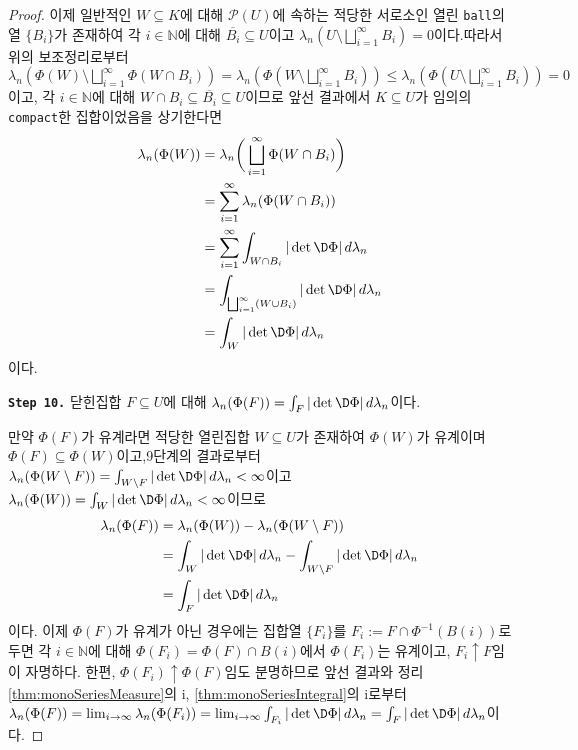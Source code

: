 \begin{proof}
    이제 일반적인 $W\subseteq K$에 대해 $\mathcal{P}(U)$에 속하는 적당한 서로소인 열린 \texttt{ball}의 열 $\{B_i\}$가 존재하여 각 $i\in\mathbb{N}$에 대해 $\overline{B_i}\subseteq U$이고 $\lambda_n(U\setminus\bigsqcup_{i=1}^\infty B_i)=0$이다.\footnotemark 따라서 위의 보조정리로부터 $\lambda_n(\Phi(W)\setminus\bigsqcup_{i=1}^\infty\Phi(W\cap B_i))=\lambda_n(\Phi(W\setminus\bigsqcup_{i=1}^\infty B_i))\leq\lambda_n(\Phi(U\setminus\bigsqcup_{i=1}^\infty B_i))=0$이고, 각 $i\in\mathbb{N}$에 대해 $W\cap B_i\subseteq\overline{B_i}\subseteq U$이므로 앞선 결과에서 $K\subseteq U$가 임의의 \texttt{compact}한 집합이었음을 상기한다면
    \begin{align*}
        \lambda_n(\Phi(W))&=\lambda_n\bigg(\bigsqcup_{i=1}^\infty\Phi(W\cap B_i)\bigg)\\
        &=\sum_{i=1}^\infty\lambda_n(\Phi(W\cap B_i))\\
        &=\sum_{i=1}^\infty\int_{W\cap B_i}|\det\D\Phi|\,d\lambda_n\\
        &=\int_{\bigsqcup_{i=1}^\infty(W\cup B_i)}|\det\D\Phi|\,d\lambda_n\\
        &=\int_W|\det\D\Phi|\,d\lambda_n
    \end{align*}
    이다.

    \noindent\texttt{\textbf{Step 10.}} 닫힌집합 $F\subseteq U$에 대해 $\lambda_n(\Phi(F))=\int_F|\det\D\Phi|\,d\lambda_n$이다.

    만약 $\Phi(F)$가 유계라면 적당한 열린집합 $W\subseteq U$가 존재하여 $\Phi(W)$가 유계이며 $\Phi(F)\subseteq\Phi(W)$이고,\footnotemark 9단계의 결과로부터 $\lambda_n(\Phi(W\setminus F))=\int_{W\setminus F}|\det\D\Phi|\,d\lambda_n<\infty$이고 $\lambda_n(\Phi(W))=\int_W|\det\D\Phi|\,d\lambda_n<\infty$이므로
    \begin{align*}
        \lambda_n(\Phi(F))&=\lambda_n(\Phi(W))-\lambda_n(\Phi(W\setminus F))\\
        &=\int_W|\det\D\Phi|\,d\lambda_n-\int_{W\setminus F}|\det\D\Phi|\,d\lambda_n\\
        &=\int_F|\det\D\Phi|\,d\lambda_n
    \end{align*}
    이다. 이제 $\Phi(F)$가 유계가 아닌 경우에는 집합열 $\{F_i\}$를 $F_i:=F\cap\Phi^{-1}(B(i))$로 두면 각 $i\in\mathbb{N}$에 대해 $\Phi(F_i)=\Phi(F)\cap B(i)$에서 $\Phi(F_i)$는 유계이고, $F_i\uparrow F$임이 자명하다. 한편, $\Phi(F_i)\uparrow\Phi(F)$임도 분명하므로 앞선 결과와 정리 \ref{thm:monoSeriesMeasure}의 i, \ref{thm:monoSeriesIntegral}의 i로부터 $\lambda_n(\Phi(F))=\lim_{i\to\infty}\lambda_n(\Phi(F_i))=\lim_{i\to\infty}\int_{F_i}|\det\D\Phi|\,d\lambda_n=\int_F|\det\D\Phi|\,d\lambda_n$이다.


\end{proof}
